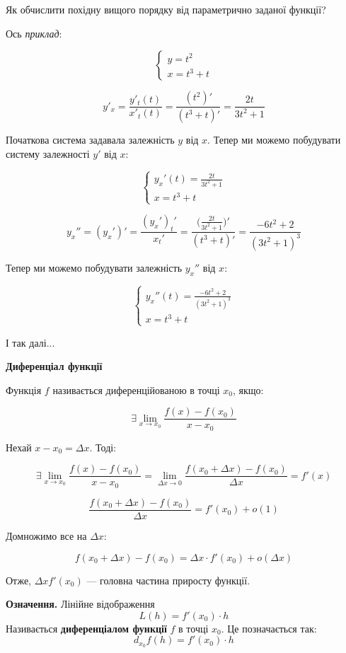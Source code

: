 \documentclass[12pt]{report}
\begin{document}
Як обчислити похідну вищого порядку від параметрично заданої функції?

\vspace{3mm}

Ось \textit{приклад}:

$$\begin{cases} y = t^2 \\ x = t^3 + t\end{cases}$$

$$y'_x = \frac{y'_t (t)}{x'_t(t)} = \frac{(t^2)'}{(t^3 + t)'} = \frac{2t}{3t^2 + 1}$$

Початкова система задавала залежність $y$ від $x$. Тепер ми можемо побудувати систему залежності $y'$ від $x$:

$$\begin{cases} y_x'(t) = \frac{2t}{3t^2 + 1} \\ x = t^3 + t\end{cases}$$

$$y_x'' = (y_x')' = \frac{(y_x')_t'}{x_t'} = \frac{\Big( \frac{2t}{3t^2 + 1} \Big)'}{(t^3 + t)'} = \frac{-6t^2 + 2}{(3t^2 + 1)^3}$$

Тепер ми можемо побудувати залежність $y_x''$ від $x$:

$$\begin{cases} y_x''(t) =  \frac{-6t^2 + 2}{(3t^2 + 1)^3} \\ x = t^3 + t\end{cases}$$

І так далі...

\begin{center}
\textbf{\large Диференціал функції}
\end{center}

Функція $f$ називається диференційованою в точці $x_0$, якщо:

$$\exists \lim_{x \to x_0}\frac{f(x) - f(x_0)}{x - x_0}$$

Нехай $x - x_0 = \Delta x$. Тоді:

$$\exists \lim_{x \to x_0}\frac{f(x) - f(x_0)}{x - x_0} = \lim_{\Delta x \to 0} \frac{f(x_0 + \Delta x) - f(x_0)}{\Delta x} = f'(x)$$

$$\frac{f(x_0 + \Delta x) - f(x_0)}{\Delta x} = f'(x_0) + o(1)$$

Домножимо все на $\Delta x$:

$$f(x_0 + \Delta x) - f(x_0) = \Delta x \cdot f'(x_0) + o(\Delta x)$$

Отже, $\Delta x f'(x_0)$ --- головна частина приросту функції.

\textbf{Означення.} Лінійне відображення 
$$L(h) = f'(x_0) \cdot h$$
Називається \textbf{диференціалом функції} $f$ в точці $x_0$. Це позначається так:
$$d_{x_0}f(h) = f'(x_0) \cdot h$$
\end{document}
